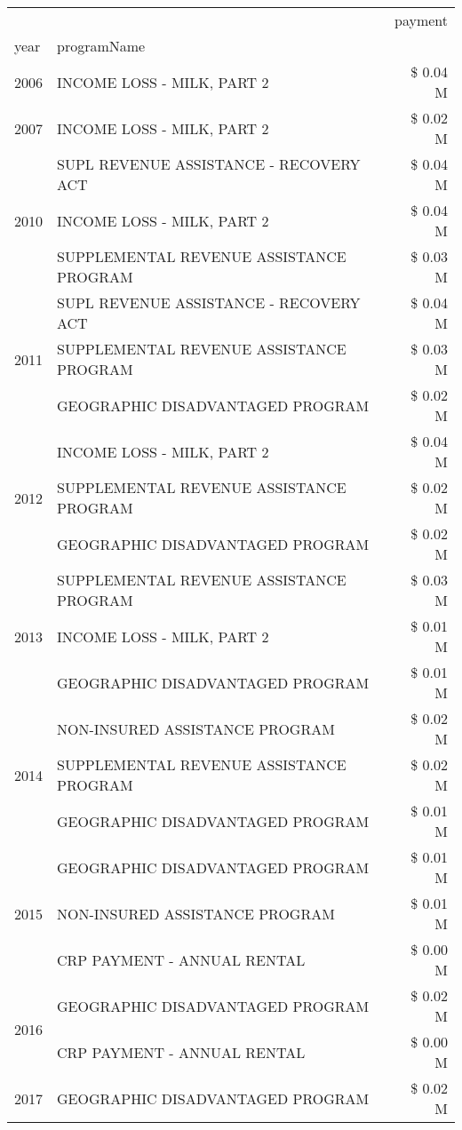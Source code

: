 \begin{tabular}{llr}
\toprule
 &  & payment \\
year & programName &  \\
\midrule
2006 & INCOME LOSS - MILK, PART 2 & \$ 0.04 M \\
\cline{1-3}
2007 & INCOME LOSS - MILK, PART 2 & \$ 0.02 M \\
\cline{1-3}
\multirow[t]{3}{*}{2010} & SUPL REVENUE ASSISTANCE - RECOVERY ACT & \$ 0.04 M \\
 & INCOME LOSS - MILK, PART 2 & \$ 0.04 M \\
 & SUPPLEMENTAL REVENUE ASSISTANCE PROGRAM & \$ 0.03 M \\
\cline{1-3}
\multirow[t]{3}{*}{2011} & SUPL REVENUE ASSISTANCE - RECOVERY ACT & \$ 0.04 M \\
 & SUPPLEMENTAL REVENUE ASSISTANCE PROGRAM & \$ 0.03 M \\
 & GEOGRAPHIC DISADVANTAGED PROGRAM & \$ 0.02 M \\
\cline{1-3}
\multirow[t]{3}{*}{2012} & INCOME LOSS - MILK, PART 2 & \$ 0.04 M \\
 & SUPPLEMENTAL REVENUE ASSISTANCE PROGRAM & \$ 0.02 M \\
 & GEOGRAPHIC DISADVANTAGED PROGRAM & \$ 0.02 M \\
\cline{1-3}
\multirow[t]{3}{*}{2013} & SUPPLEMENTAL REVENUE ASSISTANCE PROGRAM & \$ 0.03 M \\
 & INCOME LOSS - MILK, PART 2 & \$ 0.01 M \\
 & GEOGRAPHIC DISADVANTAGED PROGRAM & \$ 0.01 M \\
\cline{1-3}
\multirow[t]{3}{*}{2014} & NON-INSURED ASSISTANCE PROGRAM & \$ 0.02 M \\
 & SUPPLEMENTAL REVENUE ASSISTANCE PROGRAM & \$ 0.02 M \\
 & GEOGRAPHIC DISADVANTAGED PROGRAM & \$ 0.01 M \\
\cline{1-3}
\multirow[t]{3}{*}{2015} & GEOGRAPHIC DISADVANTAGED PROGRAM & \$ 0.01 M \\
 & NON-INSURED ASSISTANCE PROGRAM & \$ 0.01 M \\
 & CRP PAYMENT - ANNUAL RENTAL & \$ 0.00 M \\
\cline{1-3}
\multirow[t]{2}{*}{2016} & GEOGRAPHIC DISADVANTAGED PROGRAM & \$ 0.02 M \\
 & CRP PAYMENT - ANNUAL RENTAL & \$ 0.00 M \\
\cline{1-3}
\multirow[t]{3}{*}{2017} & GEOGRAPHIC DISADVANTAGED PROGRAM & \$ 0.02 M \\

\end{tabular}

